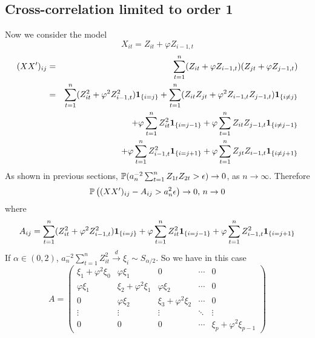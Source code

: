 \documentclass{article}
\begin{document}
\subsection{Cross-correlation limited to order 1}\label{sec:B1}
Now we consider the model
\[
X_{it} = Z_{it} + \varphi Z_{i-1,t}
\]
\begin{eqnarray*}
  (XX')_{ij} &=& \sum_{t=1}^n (Z_{it} + \varphi Z_{i-1,t})(Z_{jt} +
  \varphi Z_{j-1,t}) \\
  &=& \sum_{t=1}^n (Z_{it}^2 + \varphi^2 Z_{i-1,t}^2)\mathbf{1}_{\{i=j\}}
  + \sum_{t=1}^n (Z_{it}Z_{jt}+\varphi^2 Z_{i-1,t}Z_{j-1,t})\mathbf{1}_{\{i\neq j\}}
  \\
  && + \varphi \sum_{t=1}^n Z_{it}^2 \mathbf{1}_{\{i=j-1\}} 
  +\varphi\sum_{t=1}^n Z_{it} Z_{j-1,t}\mathbf{1}_{\{i\neq j-1\}} \\
  && + \varphi \sum_{t=1}^n Z_{i-1,t}^2 \mathbf{1}_{\{i=j+1\}} 
  +\varphi\sum_{t=1}^n Z_{jt} Z_{i-1,t}\mathbf{1}_{\{i\neq j+1\}} \\
\end{eqnarray*}
As shown in previous sections, $\mathbb{P}(a_n^{-2} \sum_{t=1}^n Z_{1t}Z_{2t} >
\epsilon) \to 0$, as $n \to \infty$. Therefore
\[
\mathbb{P}\left(
  (XX')_{ij} - A_{ij}> a_n^2 \epsilon \right) \to 0\text{,  }n \to 0
\]
where
\[
A_{ij} = \sum_{t=1}^n (Z_{it}^2 + \varphi^2 Z_{i-1,t}^2)\mathbf{1}_{\{i=j\}}
      + \varphi \sum_{t=1}^n Z_{it}^2 \mathbf{1}_{\{i=j-1\}} 
      + \varphi \sum_{t=1}^n Z_{i-1,t}^2 \mathbf{1}_{\{i=j+1\}}
\]
If $\alpha \in (0,2)$, $a_n^{-2}\sum_{t=1}^n Z_{it}^2 \xrightarrow{d}
\xi_i \sim S_{\alpha/2}$. So we have in this case
\[
A =
\begin{pmatrix}
  \xi_1 + \varphi^2 \xi_0 & \varphi \xi_1 & 0 & \cdots & 0 \\
  \varphi \xi_1 & \xi_2 + \varphi^2 \xi_1 & \varphi \xi_2 & \cdots & 0 \\
  0 & \varphi \xi_2 & \xi_3 + \varphi^2 \xi_2 & \cdots & 0 \\
  \vdots & \vdots & \vdots & \ddots & \vdots \\
  0 & 0 & 0 & \cdots & \xi_p + \varphi^2 \xi_{p-1}
\end{pmatrix}
\]
\end{document}
